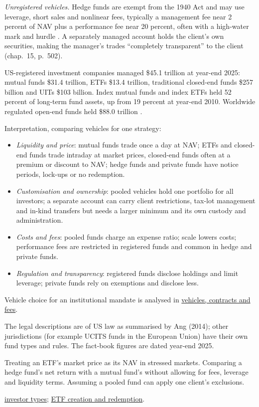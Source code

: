 \begin{qfdefinition}
\emph{Unregistered vehicles.} Hedge funds are exempt from the 1940 Act and may use leverage, short sales and nonlinear fees, typically a management fee near 2 percent of NAV plus a performance fee near 20 percent, often with a high-water mark and hurdle \citep[chap.~17, pp.~581--582]{s7-ang}. A separately managed account holds the client's own securities, making the manager's trades ``completely transparent'' to the client (chap.~15, p.~502).

 US-registered investment companies managed \$45.1 trillion at year-end 2025: mutual funds \$31.4 trillion, ETFs \$13.4 trillion, traditional closed-end funds \$257 billion and UITs \$103 billion. Index mutual funds and index ETFs held 52 percent of long-term fund assets, up from 19 percent at year-end 2010. Worldwide regulated open-end funds held \$88.0 trillion \citep[\emph{Quick Facts Guide}, ``Facts at a glance''; chap.~2, pp.~13 and~18]{investment-company-fact-book-2026}.

 Interpretation, comparing vehicles for one strategy:
\begin{itemize}
\item \emph{Liquidity and price}: mutual funds trade once a day at NAV; ETFs and closed-end funds trade intraday at market prices, closed-end funds often at a premium or discount to NAV; hedge funds and private funds have notice periods, lock-ups or no redemption.
\item \emph{Customisation and ownership}: pooled vehicles hold one portfolio for all investors; a separate account can carry client restrictions, tax-lot management and in-kind transfers but needs a larger minimum and its own custody and administration.
\item \emph{Costs and fees}: pooled funds charge an expense ratio; scale lowers costs; performance fees are restricted in registered funds and common in hedge and private funds.
\item \emph{Regulation and transparency}: registered funds disclose holdings and limit leverage; private funds rely on exemptions and disclose less.
\end{itemize}
Vehicle choice for an institutional mandate is analysed in \hyperref[meth:vehicle-contract-fee-analysis]{vehicles, contracts and fees}.

 The legal descriptions are of US law as summarised by Ang (2014); other jurisdictions (for example UCITS funds in the European Union) have their own fund types and rules. The fact-book figures are dated year-end 2025.

 Treating an ETF's market price as its NAV in stressed markets. Comparing a hedge fund's net return with a mutual fund's without allowing for fees, leverage and liquidity terms. Assuming a pooled fund can apply one client's exclusions.

 \hyperref[def:investor-types-needs]{investor types}; \hyperref[mech:etf-creation-redemption]{ETF creation and redemption}.

\end{qfdefinition}

